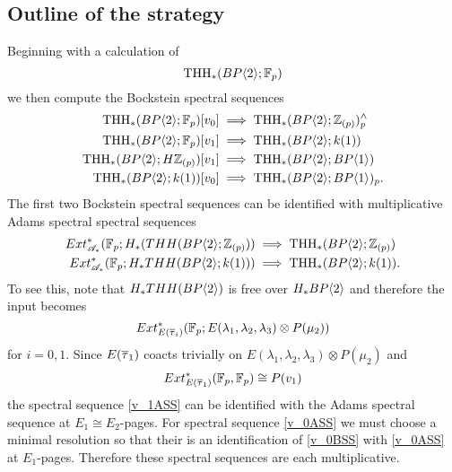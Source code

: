 \subsection{Outline of the strategy}
Beginning with a calculation of
\[\operatorname{THH}_*(BP\langle 2 \rangle;\mathbb{F}_p)\] 
we then compute the Bockstein spectral sequences 
\begin{align}
	\label{v_0BSS}\operatorname{THH}_*(BP\langle 2 \rangle;\mathbb{F}_p)[v_0]&\implies \operatorname{THH}_*(BP\langle 2 \rangle;\mathbb{Z}_{(p)})^{\wedge}_p\\
	\label{v_1BSS}\operatorname{THH}_*(BP\langle 2 \rangle;\mathbb{F}_p)[v_1]&\implies \operatorname{THH}_*(BP\langle 2 \rangle;k(1)) \\
	\label{v_0v_1BSS}\operatorname{THH}_*(BP\langle 2 \rangle;H\mathbb{Z}_{(p)})[v_1]&\implies \operatorname{THH}_*(BP\langle 2 \rangle;BP\langle 1 \rangle)\\
	\label{v_1v_0BSS}\operatorname{THH}_*(BP\langle 2 \rangle;k(1))[v_0]&\implies \operatorname{THH}_*(BP\langle 2 \rangle;BP\langle 1 \rangle)_p.
\end{align}
The first two Bockstein spectral sequences can be identified with multiplicative Adams spectral spectral sequences 
\begin{align}
	\label{v_0ASS}Ext_{\mathscr{A}_*}^*(\mathbb{F}_p; H_*(THH(BP\langle 2 \rangle;\mathbb{Z}_{(p)}))&\implies \operatorname{THH}_*(BP\langle 2 \rangle;\mathbb{Z}_{(p)})\\
	\label{v_1ASS}Ext_{\mathscr{A}_*}^*(\mathbb{F}_p;H_*THH(BP\langle 2 \rangle;k(1)))&\implies \operatorname{THH}_*(BP\langle 2 \rangle;k(1)). 
\end{align}
To see this, note that $H_*THH(BP\langle 2 \rangle)$ is free over $H_*BP\langle 2 \rangle$ and therefore the input becomes
\[Ext_{E(\overline{\tau}_i)}^*(\mathbb{F}_p;E(\lambda_1,\lambda_2,\lambda_3)\otimes P(\mu_2))\]
for $i=0,1$. Since $E(\overline{\tau}_1)$ coacts trivially on $E(\lambda_1,\lambda_2,\lambda_3)\otimes P(\mu_2)$ and 
\[Ext_{E(\overline{\tau}_1)}^*(\mathbb{F}_p,\mathbb{F}_p)\cong P(v_1)\] 
the spectral sequence \eqref{v_1ASS} can be identified with the Adams spectral sequence at $E_1\cong E_2$-pages. For spectral sequence \eqref{v_0ASS} we must choose a minimal resolution so that their is an identification of  \eqref{v_0BSS} with \eqref{v_0ASS} at $E_1$-pages. Therefore these spectral sequences are each multiplicative. 

